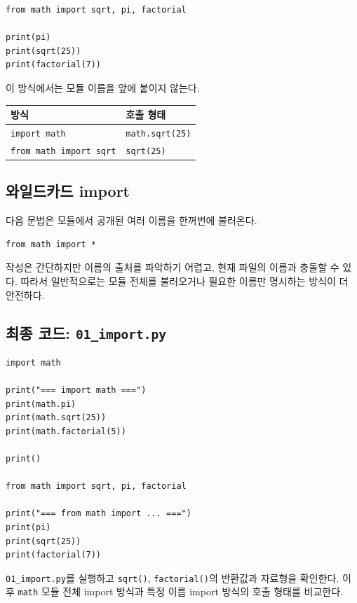 \documentclass[11pt,a4paper]{article}
\begin{document}
\begin{lstlisting}
from math import sqrt, pi, factorial

print(pi)
print(sqrt(25))
print(factorial(7))
\end{lstlisting}

이 방식에서는 모듈 이름을 앞에 붙이지 않는다.

\begin{center}
\begin{tabular}{ll}
\toprule
방식 & 호출 형태 \\
\midrule
\texttt{import math} & \texttt{math.sqrt(25)} \\
\texttt{from math import sqrt} & \texttt{sqrt(25)} \\
\bottomrule
\end{tabular}
\end{center}

\subsection{와일드카드 import}

다음 문법은 모듈에서 공개된 여러 이름을 한꺼번에 불러온다.

\begin{lstlisting}
from math import *
\end{lstlisting}

작성은 간단하지만 이름의 출처를 파악하기 어렵고, 현재 파일의 이름과 충돌할 수 있다. 따라서 일반적으로는 모듈 전체를 불러오거나 필요한 이름만 명시하는 방식이 더 안전하다.

\subsection{최종 코드: \texttt{01\_import.py}}

\begin{lstlisting}
import math

print("=== import math ===")
print(math.pi)
print(math.sqrt(25))
print(math.factorial(5))

print()

from math import sqrt, pi, factorial

print("=== from math import ... ===")
print(pi)
print(sqrt(25))
print(factorial(7))
\end{lstlisting}

\begin{practicebox}
\texttt{01\_import.py}를 실행하고 \texttt{sqrt()}, \texttt{factorial()}의 반환값과 자료형을 확인한다. 이후 \texttt{math} 모듈 전체 import 방식과 특정 이름 import 방식의 호출 형태를 비교한다.
\end{practicebox}
\end{document}
